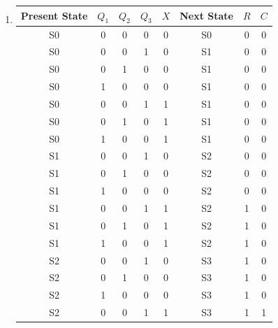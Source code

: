 \documentclass[12pt letter]{report}
\begin{document}
{\begin{enumerate}
\begin{table}[h!]
\begin{center}
\begin{tabular}{|c c c c |c|c|c|c|}
        \hline
      \end{tabular}
    \end{center}
  \end{table}
  \item
  \begin{table}[H]
    \begin{center}
      \begin{tabular}{|c c c c c|c c c|}
        \hline
        Present State & $Q_1$ & $Q_2$ & $Q_3$ & $X$ & Next State & $R$ & $C$ \\ [0.5ex]
        \hline
        \hline
        S0            & 0     & 0     & 0     & 0   & S0         & 0   & 0   \\
        S0            & 0     & 0     & 1     & 0   & S1         & 0   & 0   \\
        S0            & 0     & 1     & 0     & 0   & S1         & 0   & 0   \\
        S0            & 1     & 0     & 0     & 0   & S1         & 0   & 0   \\
        S0            & 0     & 0     & 1     & 1   & S1         & 0   & 0   \\
        S0            & 0     & 1     & 0     & 1   & S1         & 0   & 0   \\
        S0            & 1     & 0     & 0     & 1   & S1         & 0   & 0   \\
        S1            & 0     & 0     & 1     & 0   & S2         & 0   & 0   \\
        S1            & 0     & 1     & 0     & 0   & S2         & 0   & 0   \\
        S1            & 1     & 0     & 0     & 0   & S2         & 0   & 0   \\
        S1            & 0     & 0     & 1     & 1   & S2         & 1   & 0   \\
        S1            & 0     & 1     & 0     & 1   & S2         & 1   & 0   \\
        S1            & 1     & 0     & 0     & 1   & S2         & 1   & 0   \\
        S2            & 0     & 0     & 1     & 0   & S3         & 1   & 0   \\
        S2            & 0     & 1     & 0     & 0   & S3         & 1   & 0   \\
        S2            & 1     & 0     & 0     & 0   & S3         & 1   & 0   \\
        S2            & 0     & 0     & 1     & 1   & S3         & 1   & 1   \\

\end{tabular}
\end{center}
\end{table}
\end{enumerate}}
\end{document}

